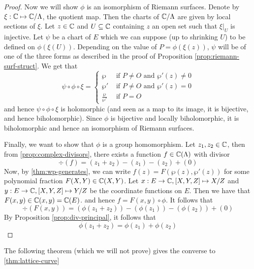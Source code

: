 \begin{proof}
	Now we will show $\phi$ is an isomorphism of Riemann surfaces.
	Denote by $\xi: \mathbb{C} \mapsto \mathbb{C}/\Lambda$, the quotient map.
	Then the charts of $\mathbb{C}/\Lambda$ are given by local sections of $\xi$.
	Let $z \in \mathbb{C}$ and $U \subseteq \mathbb{C}$ containing $z$ an open set such that 
	$\xi\vert_U$ is injective. Let $\psi$ be a chart of $E$
	which we can suppose (up to shrinking $U$) to be defined on
	$\phi(\xi(U))$.
	Depending on the value of $P = \phi(\xi(z))$, $\psi$ will be of one of the
	three forms as described in the proof of 
	Proposition \ref{prop:riemann-surf-struct}.
	We get that
	\begin{equation*}
		\psi\circ\phi\circ\xi = 
		\begin{cases}
			\wp &\textrm{ if } P \neq O\textrm{ and }\wp'(z) \neq 0\\
			\wp' &\textrm{ if } P \neq O\textrm{ and }\wp'(z) = 0\\
			\frac{\wp}{\wp'} &\textrm{ if }P = O
		\end{cases}
	\end{equation*}
	and hence $\psi\circ\phi\circ\xi$ is holomorphic (and seen as a map to its
	image, it is bijective, and hence biholomorphic). Since $\phi$ is
	bijective and locally biholomorphic, it is
	biholomorphic and hence an isomorphism of Riemann surfaces.
	
	Finally, we want to show that $\phi$ is a group homomorphism.
	Let $z_1, z_2 \in \mathbb{C}$, then from \ref{prop:complex-divisors}, there exists
	a function $f \in \mathbb{C}(\Lambda)$ with divisor
	\begin{equation*}
		\div(f) = (z_1 + z_2) - (z_1) - (z_2) + (0)
	\end{equation*}
	Now, by \ref{thm:wp-generates}, we can write $f(z) = F(\wp(z), \wp'(z))$ for
	some polynomial fraction $F(X, Y) \in \mathbb{C}(X, Y)$.
	Let $x: E \to \mathbb{C}, [X, Y, Z] \mapsto X/Z$ and
	$y: E \to \mathbb{C}, [X, Y, Z] \mapsto Y/Z$ be the coordinate functions on
	$E$. Then we have that
	$F(x, y) \in \mathbb{C}(x, y) = \mathbb{C}(E)$.
	and hence $f = F(x, y) \circ \phi$. It follows that
	\begin{equation*}
		\div (F(x, y)) = (\phi(z_1 + z_2)) - (\phi(z_1)) - (\phi(z_2)) + (0)
	\end{equation*}
	By Proposition \ref{prop:div-principal}, it follows that
	\begin{equation*}
		\phi(z_1 + z_2) = \phi(z_1) + \phi(z_2)
	\end{equation*}
\end{proof}

The following theorem (which we will not prove) gives the converse to \ref{thm:lattice-curve}

